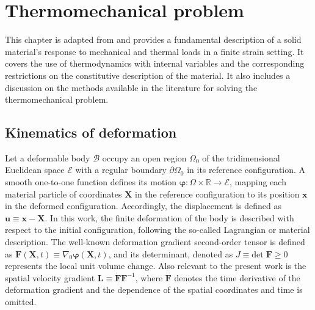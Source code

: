 \chapter{Thermomechanical problem} \label{ch:thermomechanical_problem}

This chapter is adapted from \cite{vila-chaNumericalAssessmentPartitioned2023a} and provides a fundamental description of a solid material's response to mechanical and thermal loads in a finite strain setting.
It covers the use of thermodynamics with internal variables and the corresponding restrictions on the constitutive description of the material.
It also includes a discussion on the methods available in the literature for solving the thermomechanical problem.

\section{Kinematics of deformation} \label{sec:kinematics_of_deformation}

Let a deformable body $\mathscr{B}$ occupy an open region $\Omega_0$ of the tridimensional Euclidean space $\mathscr{E}$ with a regular boundary $\partial \Omega_0$ in its reference configuration.
A smooth one-to-one function defines its motion \(\bm{\varphi}\colon \Omega\times \mathbb{R}\to \mathscr{E}\), mapping each material particle of coordinates $\bm{X}$ in the reference configuration to its position $\bm{x}$ in the deformed configuration.
Accordingly, the displacement is defined as \(\bm{u}\equiv \bm{x} - \bm{X}\).
In this work, the finite deformation of the body is described with respect to the initial configuration, following the so-called Lagrangian or material description.
The well-known deformation gradient second-order tensor is defined as \(\bm{F}(\bm{X},t)\equiv \nabla_0\bm\varphi(\bm{X},t)\), and its determinant, denoted as \(J\equiv \text{det}\;\bm{F} \geq 0\) represents the local unit volume change.
Also relevant to the present work is the spatial velocity gradient $\bm L\equiv \dot{\bm F}{\bm F}^{-1}$, where $\dot{\bm F}$ denotes the time derivative of the deformation gradient and the dependence of the spatial coordinates and time is omitted.

